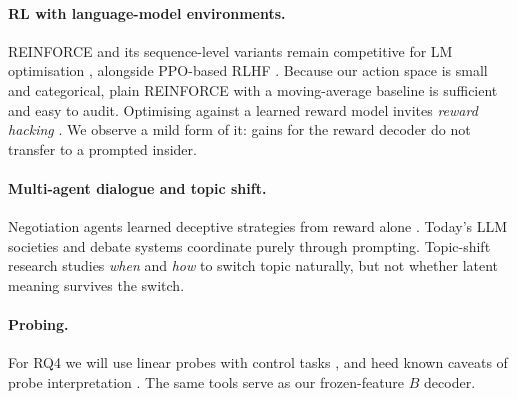\documentclass[10pt,a4paper,twocolumn]{article}
\newcommand{\1}{\mathbb{1}}
\begin{document}
\paragraph{RL with language-model environments.}
REINFORCE \citep{williams1992simple} and its sequence-level variants \citep{ranzato2016sequence} remain competitive for LM optimisation \citep{ahmadian2024back}, alongside PPO-based RLHF \citep{schulman2017ppo,ouyang2022training}. Because our action space is small and categorical, plain REINFORCE with a moving-average baseline is sufficient and easy to audit. Optimising against a learned reward model invites \emph{reward hacking} \citep{skalse2022defining}. We observe a mild form of it: gains for the reward decoder do not transfer to a prompted insider.

\paragraph{Multi-agent dialogue and topic shift.}
Negotiation agents learned deceptive strategies from reward alone \citep{lewis2017deal}. Today's LLM societies \citep{park2023generative,li2023camel} and debate systems \citep{du2024debate} coordinate purely through prompting. Topic-shift research \citep{xie2021tiage,sevegnani2021otters} studies \emph{when} and \emph{how} to switch topic naturally, but not whether latent meaning survives the switch.

\paragraph{Probing.}
For RQ4 we will use linear probes \citep{alain2016understanding} with control tasks \citep{hewitt2019designing}, and heed known caveats of probe interpretation \citep{belinkov2022probing}. The same tools serve as our frozen-feature $B$ decoder.
\end{document}
